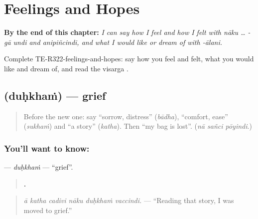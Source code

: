 
\chapter{Feelings and Hopes}
\label{ch:te-feelings-and-hopes}

\begin{chapteropening}
\textbf{By the end of this chapter:} \emph{I can say how I feel and how I felt with nāku … -gā undi and anipiñcindi, and what I would like or dream of with -ālani.}

Complete TE-R322-feelings-and-hopes: say how you feel and felt, what you would like and dream of, and read the visarga .
\end{chapteropening}

\section[\texorpdfstring{\te{దుఃఖం} (duḥkhaṁ)}{దుఃఖం (duḥkhaṁ)}]{ (duḥkhaṁ) — grief}

\label{lesson:TE-C322-duhkham}



\begin{quote}
Before the new one: say \textquotedblleft{}sorrow, distress\textquotedblright{} (\emph{bādha}), \textquotedblleft{}comfort, ease\textquotedblright{} (\emph{sukhaṁ}) and \textquotedblleft{}a story\textquotedblright{} (\emph{katha}). Then \textquotedblleft{}my bag is lost\textquotedblright{}. (\emph{nā sañci pōyindi}.)
\end{quote}

\subsection*{You'll want to know: }
\textbf{} — \emph{duḥkhaṁ} — \textquotedblleft{}grief\textquotedblright{}.

\begin{quote}
\textbf{     .}
\end{quote}

\begin{quote}
\emph{ā katha cadivi nāku duḥkhaṁ vaccindi.} — \textquotedblleft{}Reading that story, I was moved to grief.\textquotedblright{}
\end{quote}

